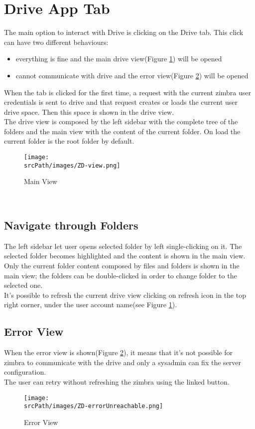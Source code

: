 \section{Drive App Tab}

The main option to interact with Drive is clicking on the Drive tab.
This click can have two different behaviours: 
\begin{itemize}
    \item{everything is fine and the main drive view(Figure \ref{fig:view}) will be opened}
    \item{cannot communicate with drive and the error view(Figure \ref{fig:errUnreachable}) will be opened}
\end{itemize}

When the tab is clicked for the first time, a request with the current zimbra user credentials is sent to drive and 
that request creates or loads the current user drive space. Then this space is shown in the drive view.\\
The drive view is composed by the left sidebar with the complete tree of the folders 
and the main view with the content of the current folder. On load the current folder is the root folder by default.\\
\begin{figure}[htbp,!h] 
\centering 
\texttt{[image: \\srcPath/images/ZD-view.png]} 
\caption{Main View} 
\label{fig:view}
\end{figure}
\\

\subsection{Navigate through Folders}
The left sidebar let user opens selected folder by left single-clicking on it. 
The selected folder becomes highlighted and the content is shown in the main view.\\
Only the current folder content composed by files and folders is shown in the main view;
the folders can be double-clicked in order to change folder to the selected one.\\
It's possible to refresh the current drive view clicking on refresh icon in the top right corner, under the user account name(see Figure \ref{fig:view}).

\subsection{Error View}
When the error view is shown(Figure \ref{fig:errUnreachable}), it means that it's not possible for zimbra to communicate with the drive and
only a sysadmin can fix the server configuration.\\
The user can retry without refreshing the zimbra using the linked button.
\begin{figure}[htbp,!h] 
\centering 
\texttt{[image: \\srcPath/images/ZD-errorUnreachable.png]} 
\caption{Error View} 
\label{fig:errUnreachable}
\end{figure}
